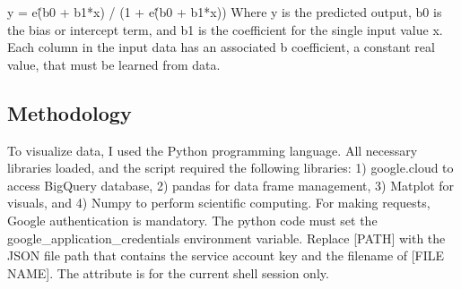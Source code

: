 \documentclass[conference]{IEEEtran}
\begin{document}
y = e\^ (b0 + b1*x) / (1 + e\^(b0 + b1*x))
\newline 
\newline
Where y is the predicted output, b0 is the bias or intercept term, and b1 is the coefficient for the single input value x. Each column in the input data has an associated b coefficient, a constant real value, that must be learned from data.

\subsection{Methodology}
To visualize data, I used the Python programming language.  All necessary libraries loaded, and the script required the following libraries: 1) google.cloud to access BigQuery database, 2) pandas for data frame management, 3) Matplot for visuals, and 4) Numpy to perform scientific computing.  For making requests, Google authentication is mandatory. The python code must set the google\_application\_credentials environment variable. Replace [PATH] with the JSON file path that contains the service account key and the filename of [FILE NAME]. The attribute is for the current shell session only.
\end{document}
